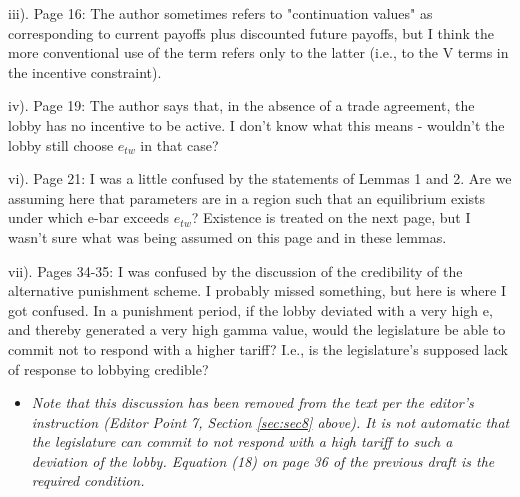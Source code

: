 \documentclass[12pt]{article}
\begin{document}
iii). Page 16: The author sometimes refers to "continuation values" as corresponding to current payoffs plus discounted future payoffs, but I think the more conventional use of the term refers only to the latter (i.e., to the V terms in the incentive constraint).

iv). Page 19: The author says that, in the absence of a trade agreement, the lobby has no incentive to be active. I don't know what this means - wouldn't the lobby still choose $e_{tw}$ in that case?

vi). Page 21: I was a little confused by the statements of Lemmas 1 and 2. Are we assuming here that parameters are in a region such that an equilibrium exists under which e-bar exceeds $e_{tw}$? Existence is treated on the next page, but I wasn't sure what was being assumed on this page and in these lemmas.

vii). Pages 34-35: I was confused by the discussion of the credibility of the alternative punishment scheme. I probably missed something, but here is where I got confused. In a punishment period, if the lobby deviated with a very high e, and thereby generated a very high gamma value, would the legislature be able to commit not to respond with a higher tariff? I.e., is the legislature's supposed lack of response to lobbying credible?
\begin{itemize}
	\item \textit{Note that this discussion has been removed from the text per the editor's instruction (Editor Point 7, Section \ref{sec:sec8} above). It is not automatic that the legislature can commit to not respond with a high tariff to such a deviation of the lobby. Equation (18) on page 36 of the previous draft is the required condition.}
\end{itemize}

\newpage
\end{document}
